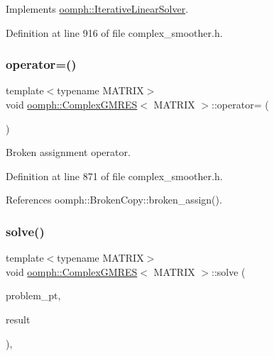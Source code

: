 Implements \hyperlink{classoomph_1_1IterativeLinearSolver_a5fe7f7b5e4847fdbd4f95d3875ec7a46}{oomph\+::\+Iterative\+Linear\+Solver}.



Definition at line 916 of file complex\+\_\+smoother.\+h.

\mbox{\label{classoomph_1_1ComplexGMRES_a1b42167d4635b2ca294ed7aa843e9de5}} 
\subsubsection{\texorpdfstring{operator=()}{operator=()}}
{\footnotesize\ttfamily template$<$typename M\+A\+T\+R\+IX$>$ \\
void \hyperlink{classoomph_1_1ComplexGMRES}{oomph\+::\+Complex\+G\+M\+R\+ES}$<$ M\+A\+T\+R\+IX $>$\+::operator= (\begin{DoxyParamCaption}\item[{const \hyperlink{classoomph_1_1ComplexGMRES}{Complex\+G\+M\+R\+ES}$<$ M\+A\+T\+R\+IX $>$ \&}]{ }\end{DoxyParamCaption})\hspace{0.3cm}{\ttfamily [inline]}}



Broken assignment operator. 



Definition at line 871 of file complex\+\_\+smoother.\+h.



References oomph\+::\+Broken\+Copy\+::broken\+\_\+assign().

\mbox{\label{classoomph_1_1ComplexGMRES_a76987ec784cd80e6605c63ef8d0ec6b7}} 
\subsubsection{\texorpdfstring{solve()}{solve()}\hspace{0.1cm}{\footnotesize\ttfamily [1/2]}}
{\footnotesize\ttfamily template$<$typename M\+A\+T\+R\+IX$>$ \\
void \hyperlink{classoomph_1_1ComplexGMRES}{oomph\+::\+Complex\+G\+M\+R\+ES}$<$ M\+A\+T\+R\+IX $>$\+::solve (\begin{DoxyParamCaption}\item[{\hyperlink{classoomph_1_1Problem}{Problem} $\ast$const \&}]{problem\+\_\+pt,  }\item[{\hyperlink{classoomph_1_1DoubleVector}{Double\+Vector} \&}]{result }\end{DoxyParamCaption})\hspace{0.3cm}{\ttfamily [inline]}, {\ttfamily [virtual]}}



